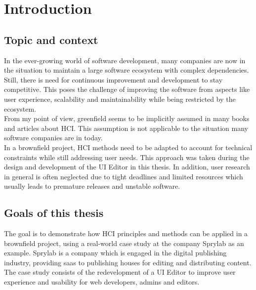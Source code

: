 %
\chapter{Introduction}
\label{chap:introduction}

\section{Topic and context}

In the ever-growing world of software development, many companies are now in the situation to maintain a large software ecosystem with complex dependencies.
Still, there is need for continuous improvement and development to stay competitive.
This poses the challenge of improving the software from aspects like user experience, scalability and maintainability while being restricted by the ecosystem.
\\
From my point of view, \Gls{greenfield} seems to be implicitly assumed in many books and articles about HCI.
This assumption is not applicable to the situation many software companies are in today.
\\
In a brownfield project, HCI methods need to be adapted to account for technical constraints while still addressing user needs. This approach was taken during the design and development of the UI Editor in this thesis.
In addition, user research in general is often neglected due to tight deadlines and limited resources which usually leads to premature releases and unstable software.

\section{Goals of this thesis}
The goal is to demonstrate how HCI principles and methods can be applied in a brownfield project, using a real-world case study at the company Sprylab as an example.
Sprylab is a company which is engaged in the digital publishing industry, providing \Gls{saas} to publishing houses for editing and distributing content.
The case study consists of the redevelopment of a UI Editor to improve user experience and usability for web developers, admins and editors.


